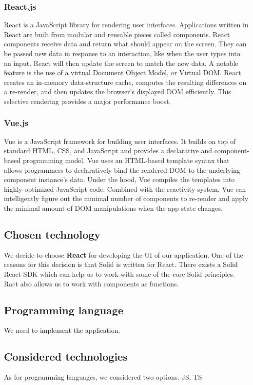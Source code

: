 \subsubsection*{React.js}
React is a JavaScript library for rendering user interfaces.
Applications written in React are built from modular and reusable pieces called components.
React components receive data and return what should appear on the screen. 
They can be passed new data in response to an interaction, like when the user types into an input. 
React will then update the screen to match the new data.
A notable feature is the use of a virtual Document Object Model, or Virtual DOM. 
React creates an in-memory data-structure cache, computes the resulting differences on a re-render, and then updates the browser's displayed DOM efficiently. 
This selective rendering provides a major performance boost.

\subsubsection*{Vue.js}
Vue is a JavaScript framework for building user interfaces. 
It builds on top of standard HTML, CSS, and JavaScript and provides a declarative and component-based programming model.
Vue uses an HTML-based template syntax that allows programmers to declaratively bind the rendered DOM to the underlying component instance's data.
Under the hood, Vue compiles the templates into highly-optimized JavaScript code. 
Combined with the reactivity system, Vue can intelligently figure out the minimal number of components to re-render and apply the minimal amount of DOM manipulations when the app state changes.

\subsection*{Chosen technology}
We decide to choose \textbf{React} for developing the UI of our application.
One of the reasons for this decision is that Solid is written for React.
There exists a Solid React SDK which can help us to work with some of the core Solid principles.
Ract also allows us to work with components as functions.

\subsection{Programming language}
We need to implement the application.

\subsection*{Considered technologies}
As for programming languages, we considered two options. 
JS, TS

